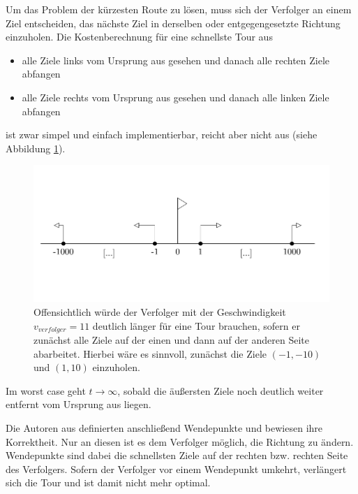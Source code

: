 \documentclass[german,version-2019-11]{uzl-thesis}
\begin{document}
Um das Problem der kürzesten Route zu lösen, muss sich der Verfolger an einem Ziel entscheiden, das nächste Ziel in derselben oder entgegengesetzte Richtung einzuholen. Die Kostenberechnung für eine schnellste Tour aus
\begin{itemize}
\item alle Ziele links vom Ursprung aus gesehen und danach alle rechten Ziele abfangen
\item alle Ziele rechts vom Ursprung aus gesehen und danach alle linken Ziele abfangen
\end{itemize} 
ist zwar simpel und einfach implementierbar, reicht aber nicht aus (siehe Abbildung \ref{fig:GegenBsp1Dim}).
\begin{figure}[htbp]
\centering
\includegraphics[scale=0.68]{../Grafiken/Verwendete/1DGegenbsp.PNG}
\caption{Offensichtlich würde der Verfolger mit der Geschwindigkeit $v_{verfolger}=11$ deutlich länger für eine Tour brauchen, sofern er zunächst alle Ziele auf der einen und dann auf der anderen Seite abarbeitet. Hierbei wäre es sinnvoll, zunächst die Ziele $(-1,-10)$ und $(1,10)$ einzuholen.}
\label{fig:GegenBsp1Dim}
\end{figure}
Im worst case geht $t\rightarrow\infty$, sobald die äußersten Ziele noch deutlich weiter entfernt vom Ursprung aus liegen. 

Die Autoren aus \cite{helvig} definierten anschließend Wendepunkte und bewiesen ihre Korrektheit. Nur an diesen ist es dem Verfolger möglich, die Richtung zu ändern. Wendepunkte sind dabei die schnellsten Ziele auf der rechten bzw. rechten Seite des Verfolgers. Sofern der Verfolger vor einem Wendepunkt umkehrt, verlängert sich die Tour und ist damit nicht mehr optimal.
\end{document}
